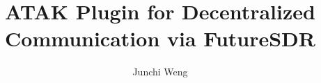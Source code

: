 \documentclass[sigconf]{acmart}
\begin{document}
\title{ATAK Plugin for Decentralized Communication via FutureSDR}


\author{Junchi Weng}

\renewcommand{\shortauthors}{J.Weng}

\begin{comment}
  \begin{abstract} %
    You may want to answer the following questions with roughly one sentence each.

    \begin{itemize}
    \item What is the topic of your main seminar paper?
    \item What problem does it solve?
    \item Why is that topic/problem important?
    \item What methodologies do the authors apply?
    \item What are the main contributions of the paper?
    \item What are the key findings/results of the paper?
    \end{itemize}
    
  \textbf{Hint 1:} You do not have to answer every question above. Consider only those that are relevant to your paper. 

  \end{abstract}
  ......
\end{comment}


\maketitle









\newpage


\end{document}
